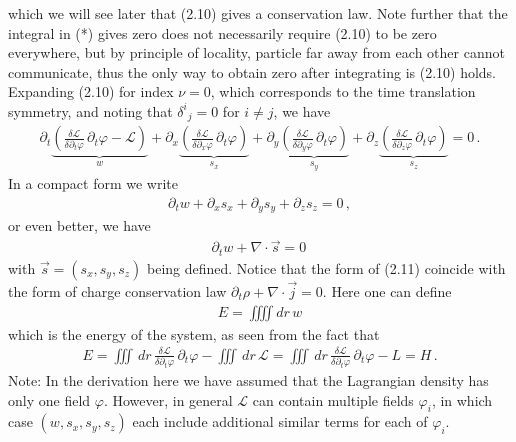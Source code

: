 \documentclass[11pt, onesided]{book}
\theoremstyle{break}
\theoremstyle{break}
\newcommand{\pd}{\partial}
\newcommand{\note}{\color{red}Note: \color{black}}
\begin{document}
which we will see later that (2.10) gives a conservation law. Note further that the integral in (*) gives zero does not necessarily require (2.10) to be zero everywhere, but by principle of locality, particle far away from each other cannot communicate, thus the only way to obtain zero after integrating is (2.10) holds. Expanding (2.10) for index $\nu = 0$, which corresponds to the time translation symmetry, and noting that $\delta^i{}_j = 0$ for $i \neq j$, we have
\begin{align*}
\pd_t \underbrace{\left( \frac{\delta \mathcal{L}}{\delta \pd_t \varphi} \, \pd_t \varphi - \mathcal{L}  \right)}_w + \pd_x \underbrace{\left( \frac{\delta \mathcal{L}}{\delta \pd_x \varphi} \, \pd_t \varphi \right)}_{s_x} +\pd_y \underbrace{\left( \frac{\delta \mathcal{L}}{\delta \pd_y \varphi} \, \pd_t \varphi \right)}_{s_y} + \pd_z \underbrace{\left( \frac{\delta \mathcal{L}}{\delta \pd_z \varphi} \, \pd_t \varphi \right)}_{s_z}  = 0\,.
\end{align*}
In a compact form we write
\begin{align*}
\pd_t w + \pd_x s_x + \pd_y  s_y + \pd_z s_z = 0\,,
\end{align*}
or even better, we have
\begin{align}
\pd_t w + \nabla \cdot \vec{s} = 0\,
\end{align}
with $\vec{s} = (s_x,s_y,s_z)$ being defined. Notice that the form of (2.11) coincide with the form of charge conservation law $\pd_t \rho + \nabla\cdot \vec{j} = 0$. Here one can define
\begin{align*}
E = \iiiint dr\, w
\end{align*}
which is the energy of the system, as seen from the fact that 
\begin{align*}
E =\iiint\, dr\, \frac{\delta \mathcal{L}}{\delta \pd_t \varphi} \, \pd_t \varphi - \iiint \, dr\, \mathcal{L} = \iiint\, dr\, \frac{\delta \mathcal{L}}{\delta \pd_t \varphi} \, \pd_t \varphi - L = H\,.
\end{align*}
\note In the derivation here we have assumed that the Lagrangian density has only one field $\varphi$. However, in general $\mathcal{L}$ can contain multiple fields $\varphi_i$, in which case $(w,s_x,s_y,s_z)$ each include additional similar terms for each of $\varphi_i$. \\
\end{document}
